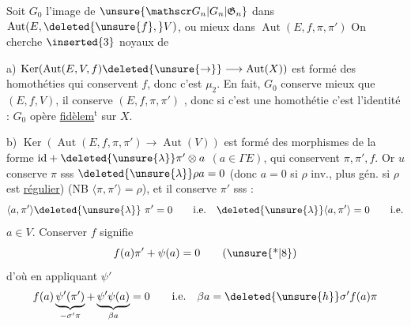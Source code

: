 Soit $G_0$ l'image de $\unsure{\mathscr G_n|G_n|\mathfrak G_n}$ dans $\operatorname{Aut}(E,\deleted{\unsure{f},}V)$, ou mieux dans $\operatorname{Aut}(E,f,\pi,\pi')$
On cherche  $\inserted{3}$ noyaux de

a) $\operatorname{Ker}(\operatorname{Aut}(E,V,f)\deleted{\unsure{\to}}\longrightarrow\operatorname{Aut}(X))$ est formé des homothéties qui conservent $f$, donc c'est $\mu_2$. En fait, $G_0$ conserve mieux que $(E,f,V)$, il conserve $(E,f,\pi,\pi')$ , donc si c'est une homothétie c'est l'identité : $G_0$ opère \uline{fidèlem$^{\mathrm t}$} sur $X$.

b) $\operatorname{Ker}(\operatorname{Aut}(E,f,\pi,\pi')\longrightarrow\operatorname{Aut}(V))$ est formé des morphismes  de la forme  $\mathrm{id}+\deleted{\unsure{\lambda}}\pi'\otimes a$ $(a\in\Gamma E)$, qui conservent $\pi,\pi',f$. Or $u$ conserve $\pi$ sss $\deleted{\unsure{\lambda}}\rho a=0$ (donc $a=0$ si $\rho$ inv., plus gén. si $\rho$ est \uline{régulier}) (NB $\langle\pi,\pi'\rangle=\rho$), et il conserve $\pi'$ sss :
\[
\langle a,\pi'\rangle\deleted{\unsure{\lambda}}\ \pi'=0\qquad\text{i.e.}\quad\deleted{\unsure{\lambda}}\langle a,\pi'\rangle=0\qquad\text{i.e.}
\]
$\boxed{a\in V.}$ Conserver $f$ signifie
\[
f(a)\pi'+\psi(a)=0\tag*{(\unsure{*|8})}
\]
d'où  en appliquant $\psi'$
\[
f(a)\underbrace{\psi'(\pi')}_{-\sigma'\pi}+\underbrace{\psi'\psi(a)}_{\beta a}=0\qquad\text{i.e.}\quad\beta a=\deleted{\unsure{h}}\sigma'f(a)\pi
\]


